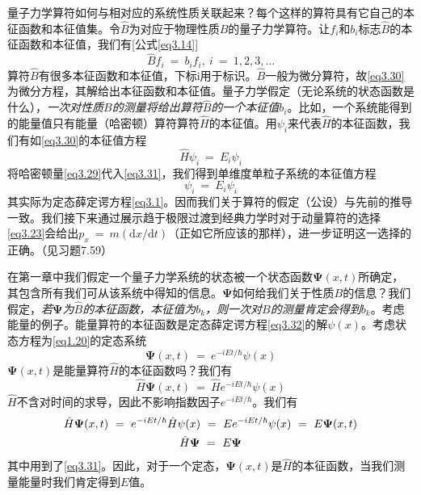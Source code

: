\documentclass[12pt,a4paper,openany]{ctexbook}
\begin{document}
\begin{flushleft}
量子力学算符如何与相对应的系统性质关联起来？每个这样的算符具有它自己的本征函数和本征值集。令$\hat{B}$为对应于物理性质$B$的量子力学算符。让$f_i$和$b_i$标志$\hat{B}$的本征函数和本征值，我们有[公式\eqref{eq3.14}]
\begin{equation}
    \hat{B}f_i\ =\ b_if_i,\ i\ =\ 1,2,3,\dots
    \label{eq3.30}
\end{equation}
算符$\hat{B}$有很多本征函数和本征值，下标i用于标识。$\hat{B}$一般为微分算符，故\eqref{eq3.30}为微分方程，其解给出本征函数和本征值。量子力学假定（无论系统的状态函数是什么），\textit{一次对性质$B$的测量将给出算符$\hat{B}$的一个本征值$b_i$}。比如，一个系统能得到的能量值只有能量（哈密顿）算符算符$\hat{H}$的本征值。用$\psi_i$来代表$\hat{H}$的本征函数，我们有如\eqref{eq3.30}的本征值方程
\begin{equation}
    \boxed{\hat{H}\psi_i\ =\ E_i\psi_i}
    \label{eq3.31}
\end{equation}
将哈密顿量\eqref{eq3.29}代入\eqref{eq3.31}，我们得到单维度单粒子系统的本征值方程
\begin{equation}
    [-\frac{\hbar^2}{2m}\frac{\mathrm{d}^2}{\mathrm{d}x^2}+V(x)]\psi_i\ =\ E_i\psi_i
    \label{eq3.32}
\end{equation}
其实际为定态薛定谔方程\eqref{eq3.1}。因而我们关于算符的假定（公设）与先前的推导一致。我们接下来通过展示趋于极限过渡到经典力学时对于动量算符的选择\eqref{eq3.23}会给出$p_x\ =\ m(\mathrm{d}x/\mathrm{d}t)$（正如它所应该的那样），进一步证明这一选择的正确。（见习题7.59）

在第一章中我们假定一个量子力学系统的状态被一个状态函数$\bm{\Psi}(x,t)$所确定，其包含所有我们可从该系统中得知的信息。$\bm{\Psi}$如何给我们关于性质$B$的信息？我们假定，\textit{若$\bm{\Psi}$为$\hat{B}$的本征函数，本征值为$b_k$，则一次对$B$的测量肯定会得到$b_k$}。考虑能量的例子。能量算符的本征函数是定态薛定谔方程\eqref{eq3.32}的解$\psi(x)$。考虑状态方程为\eqref{eq1.20}的定态系统
\begin{equation}
    \bm{\Psi}(x,t)\ =\ e^{-iEt/\hbar}\psi(x) \label{eq3.33}
\end{equation}
$\bm{\Psi}(x,t)$是能量算符$\hat{H}$的本征函数吗？我们有
\begin{equation*}
    \hat{H}\bm{\Psi}(x,t)\ =\ \hat{H}e^{-iEt/\hbar}\psi(x)
\end{equation*}
$\hat{H}$不含对时间的求导，因此不影响指数因子$e^{-iEt/\hbar}$。我们有
\begin{gather}
    \hat{H}\bm{\Psi}(x,t)\ =\ e^{-iEt/\hbar}\hat{H}\psi(x)\ =\ Ee^{-iEt/\hbar}\psi(x)\ =\ E\bm{\Psi}(x,t) \notag \\
    \hat{H}\bm{\Psi}\ =\ E\bm{\Psi} \label{eq3.34}
\end{gather}
其中用到了\eqref{eq3.31}。因此，对于一个定态，$\bm{\Psi}(x,t)$是$\hat{H}$的本征函数，当我们测量能量时我们肯定得到$E$值。


\end{flushleft}
\end{document}
